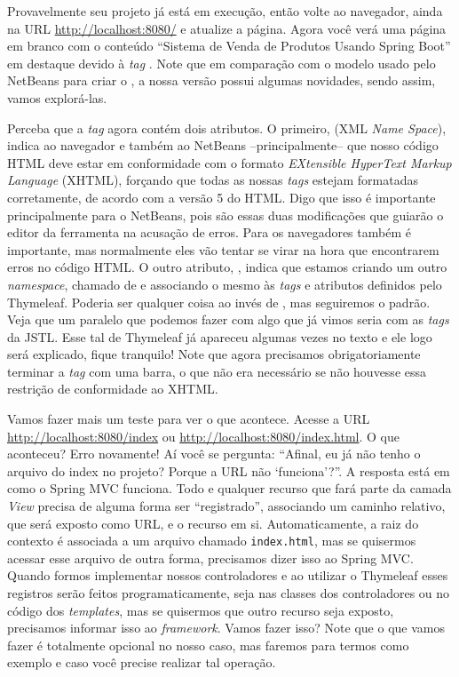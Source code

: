 
Provavelmente seu projeto já está em execução, então volte ao navegador, ainda na URL \url{http://localhost:8080/} e atualize a página. Agora você verá uma página em branco com o conteúdo ``Sistema de Venda de Produtos Usando Spring Boot'' em destaque devido à \textit{tag} . Note que em comparação com o modelo usado pelo NetBeans para criar o , a nossa versão possui algumas novidades, sendo assim, vamos explorá-las.

Perceba que a \textit{tag}  agora contém dois atributos. O primeiro,  (XML \textit{Name Space}), indica ao navegador e também ao NetBeans --principalmente-- que nosso código HTML deve estar em conformidade com o formato \textit{EXtensible HyperText Markup Language} (XHTML), forçando que todas as nossas \textit{tags} estejam formatadas corretamente, de acordo com a versão 5 do HTML. Digo que isso é importante principalmente para o NetBeans, pois são essas duas modificações que guiarão o editor da ferramenta na acusação de erros. Para os navegadores também é importante, mas normalmente eles vão tentar se virar na hora que encontrarem erros no código HTML. O outro atributo, , indica que estamos criando um outro \textit{namespace}, chamado de  e associando o mesmo às \textit{tags} e atributos definidos pelo Thymeleaf. Poderia ser qualquer coisa ao invés de , mas seguiremos o padrão. Veja que um paralelo que podemos fazer com algo que já vimos seria com as \textit{tags} da JSTL. Esse tal de Thymeleaf já apareceu algumas vezes no texto e ele logo será explicado, fique tranquilo! Note que agora precisamos obrigatoriamente terminar a \textit{tag}  com uma barra, o que não era necessário se não houvesse essa restrição de conformidade ao XHTML.

Vamos fazer mais um teste para ver o que acontece. Acesse a URL \url{http://localhost:8080/index} ou \url{http://localhost:8080/index.html}. O que aconteceu? Erro novamente! Aí você se pergunta: ``Afinal, eu já não tenho o arquivo do index no projeto? Porque a URL não `funciona'?''. A resposta está em como o Spring MVC funciona. Todo e qualquer recurso que fará parte da camada \textit{View} precisa de alguma forma ser ``registrado'', associando um caminho relativo, que será exposto como URL, e o recurso em si. Automaticamente, a raiz do contexto é associada a um arquivo chamado \texttt{index.html}, mas se quisermos acessar esse arquivo de outra forma, precisamos dizer isso ao Spring MVC. Quando formos implementar nossos controladores e ao utilizar o Thymeleaf esses registros serão feitos programaticamente, seja nas classes dos controladores ou no código dos \textit{templates}, mas se quisermos que outro recurso seja exposto, precisamos informar isso ao \textit{framework}. Vamos fazer isso? Note que o que vamos fazer é totalmente opcional no nosso caso, mas faremos para termos como exemplo e caso você precise realizar tal operação.


